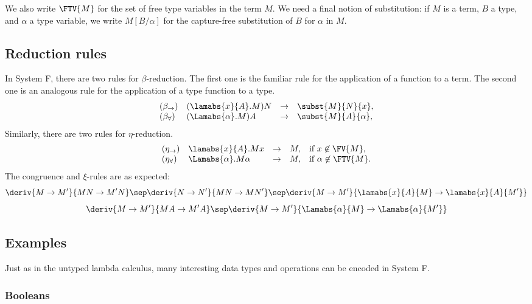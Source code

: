 \documentclass[12pt]{article}
\begin{document}
We also write $\FTV{M}$ for the set of free type variables in the term
$M$. We need a final notion of substitution: if $M$ is a term, $B$ a type,
and $\alpha$ a type variable, we write $M[B/\alpha]$ for the
capture-free substitution of $B$ for $\alpha$ in $M$. 

\subsection{Reduction rules}

In System F, there are two rules for $\beta$-reduction. The first one
is the familiar rule for the application of a function to a term. The
second one is an analogous rule for the application of a type function
to a type. 
\[ \begin{array}{lllll}
  (\beta_{\to}) & (\lamabs{x}{A}.M)N & \to & \subst{M}{N}{x}, \\
  (\beta_{\forall}) & (\Lamabs{\alpha}.M)A & \to & \subst{M}{A}{\alpha},
\end{array}
\]
Similarly, there are two rules for $\eta$-reduction.
\[ \begin{array}{lllll}
  (\eta_{\to}) & \lamabs{x}{A}.Mx & \to & M, & \mbox{if $x\not\in\FV{M}$,} \\
  (\eta_{\forall}) & \Lamabs{\alpha}.M\alpha & \to & M, & \mbox{if $\alpha\not\in\FTV{M}$.}
\end{array}
\]
The congruence and $\xi$-rules are as expected:
\[ \deriv{M\to M'}{MN\to M'N}
   \sep
   \deriv{N\to N'}{MN\to MN'}
   \sep
   \deriv{M\to M'}{\lamabs{x}{A}{M}\to\lamabs{x}{A}{M'}}
\]
\[ \deriv{M\to M'}{MA\to M'A}
   \sep
   \deriv{M\to M'}{\Lamabs{\alpha}{M}\to\Lamabs{\alpha}{M'}}
\]

\subsection{Examples}

Just as in the untyped lambda calculus, many interesting data types
and operations can be encoded in System F. 

\subsubsection{Booleans}
\end{document}
